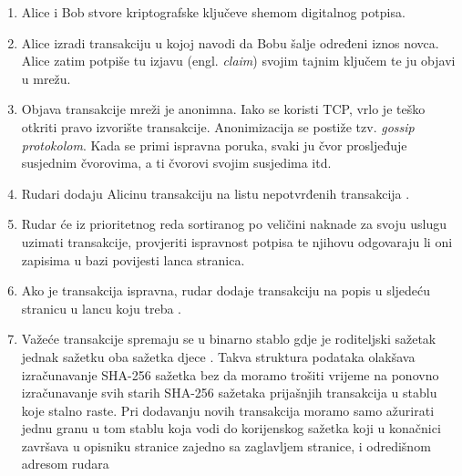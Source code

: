 \documentclass[utf8, zavrsni]{fer}
\begin{document}
\begin{enumerate}
	\item Alice i Bob stvore kriptografske ključeve shemom digitalnog potpisa.
	\item Alice izradi transakciju u kojoj navodi da Bobu šalje određeni iznos novca. Alice zatim potpiše tu izjavu (engl. \textit{claim}) svojim tajnim ključem te ju objavi u mrežu.

	\item Objava transakcije mreži je anonimna. Iako se koristi TCP, vrlo je teško otkriti pravo izvorište transakcije. Anonimizacija se postiže tzv. \textit{gossip protokolom}. Kada se primi ispravna poruka, svaki ju čvor prosljeđuje susjednim čvorovima, a ti čvorovi svojim susjedima itd.
	\item Rudari dodaju Alicinu transakciju na listu nepotvrđenih transakcija \footnotemark.
	
	\item Rudar će iz prioritetnog reda sortiranog po veličini naknade za svoju uslugu \footnotemark uzimati transakcije, provjeriti ispravnost potpisa te njihovu odgovaraju li oni zapisima u bazi povijesti lanca stranica.
	
	\item Ako je transakcija ispravna, rudar dodaje transakciju na popis u sljedeću stranicu u lancu koju treba .
	\item Važeće transakcije spremaju se u binarno stablo gdje je roditeljski sažetak jednak sažetku oba sažetka djece \footnotemark. Takva struktura podataka olakšava izračunavanje SHA-256 sažetka bez da moramo trošiti vrijeme na ponovno izračunavanje svih starih SHA-256 sažetaka prijašnjih transakcija u stablu koje stalno raste. Pri dodavanju novih transakcija moramo samo ažurirati jednu granu u tom stablu koja vodi do korijenskog sažetka koji u konačnici završava u opisniku stranice zajedno sa zaglavljem stranice, i odredišnom adresom rudara 
	

\end{enumerate}
\end{document}
